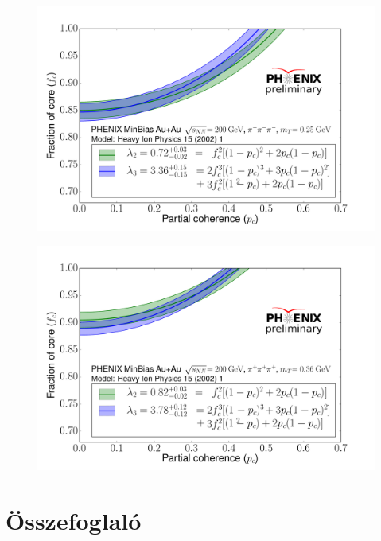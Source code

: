 \documentclass[10pt,a4paper]{article}
\numberwithin{equation}{subsection}
\numberwithin{figure}{section}
\begin{document}
\begin{figure}[H]
\centering
\includegraphics[scale=0.5]{pic/res/fcpc1.pdf}
\end{figure}
\begin{figure}[H]
\centering
\includegraphics[scale=0.5]{pic/res/fcpc2.pdf}
\end{figure}

\section{Összefoglaló}





\end{document}
